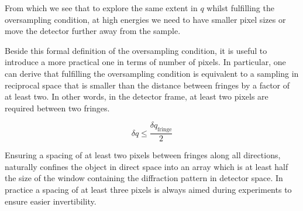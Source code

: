 From which we see that to explore the same extent in $q$ whilst fulfilling the oversampling condition, at high energies 
we need to have smaller pixel sizes or move the detector further away from the sample. 

Beside this formal definition of the oversampling condition, it is useful to introduce a more practical one in terms of 
number of pixels. In particular, one can derive that fulfilling the oversampling condition is equivalent to a sampling 
in reciprocal space that is smaller than the distance between fringes by a factor of at least two. In other words, 
in the detector frame, at least two pixels are required between two fringes. 

\begin{equation}
    \delta q \leq \frac{\delta q_{\text{fringe}}}{2}
\end{equation}

Ensuring a spacing of at least two pixels between fringes along all directions, naturally confines the 
object in direct space into an array which is at least half the size of the window containing 
the diffraction pattern in detector space. In practice a spacing of at least three pixels is always aimed during experiments 
to ensure easier invertibility. 

